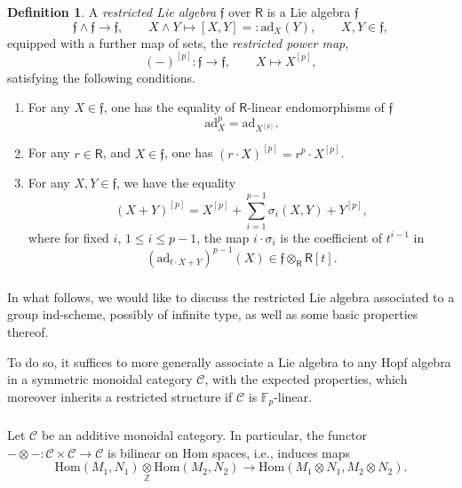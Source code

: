\documentclass{amsart}
\theoremstyle{definition}
\newtheorem{defi}[Thm]{Definition}
\newcommand{\sC}{\mathscr{C}}
\newcommand{\sss}{\subsubsection{}}
\newcommand{\Hom}{\on{Hom}}
\newcommand{\on}{\mathrm}
\newcommand{\Ring}{\mathsf{R}}
\newcommand{\F}{\mathbb{F}}
\newcommand{\ff}{\mathfrak{f}}
\numberwithin{equation}{section}
\begin{document}
\begin{defi}\label{Defi:restricted} A {\em restricted Lie algebra} $\ff$ over $\Ring$ is a Lie algebra $\ff$ $$\ff \wedge \ff \rightarrow \ff, \quad \quad X \wedge Y \mapsto [X,Y] =: \on{ad}_X(Y), \quad \quad X,Y \in \ff,$$
equipped with a further map of sets, the {\em restricted power map},
$$(-)^{[p]}: \ff \rightarrow \ff, \quad \quad X \mapsto X^{[p]},$$
satisfying the following conditions. 

\begin{enumerate}
\item For any $X \in \ff$, one has the equality of $\Ring$-linear endomorphisms of $\ff$
$$\on{ad}_X^p = \on{ad}_{X^{[p]}}.$$
    \item For any $r \in \Ring$, and $X \in \ff$, one has $(r\cdot X)^{[p]} = r^p \cdot X^{[p]}$.
    \item For any $X, Y \in \ff$, we have the equality 
    $$(X+Y)^{[p]} = X^{[p]} + \sum_{i=1}^{p-1} \sigma_i(X,Y) + Y^{[p]},$$
    where for fixed $i$, $1 \leqslant i \leqslant p-1$, the map $i \cdot \sigma_i$ is the coefficient of $t^{i-1}$ in $$(\on{ad}_{t \cdot X + Y})^{p-1}(X) \in \ff \otimes_{\Ring} \Ring[t].$$
\end{enumerate}
\end{defi}


\sss In what follows, we would like to discuss the restricted Lie algebra associated to a group ind-scheme, possibly of infinite type, as well as some basic properties thereof. 

To do so, it suffices to more generally associate a Lie algebra to any Hopf algebra in a symmetric monoidal category $\sC$, with the expected properties, which moreover inherits a restricted structure if $\sC$ is $\F_p$-linear. 



\sss Let $\sC$ be an additive monoidal category. In particular,  the functor $- \otimes -: \sC \times \sC \rightarrow \sC$ is bilinear on Hom spaces, i.e., induces maps 
$$\Hom(M_1, N_1) \underset{\mathbb{Z}} \otimes \Hom(M_2, N_2) \rightarrow \Hom(M_1 \otimes N_1, M_2 \otimes N_2).$$
\end{document}
